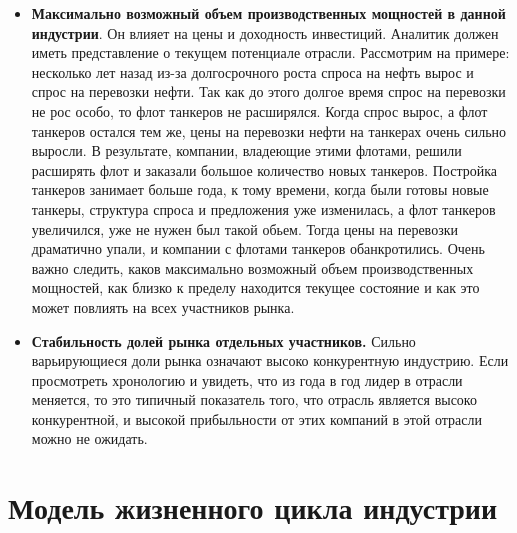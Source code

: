 \documentclass{article}
\begin{document}
\begin{itemize}
	\item \textbf {Максимально возможный объем производственных мощностей в данной индустрии}. Он влияет на цены и доходность инвестиций. Аналитик должен иметь представление о текущем потенциале отрасли. Рассмотрим на примере: несколько лет назад из-за долгосрочного роста спроса на нефть вырос и спрос на перевозки нефти. Так как до этого долгое время спрос на перевозки не рос особо, то флот танкеров не расширялся. Когда спрос вырос, а флот танкеров остался тем же, цены на перевозки нефти на танкерах очень сильно выросли. В результате, компании, владеющие этими флотами, решили расширять флот и заказали большое количество новых танкеров. Постройка танкеров занимает больше года, к тому времени, когда были готовы новые танкеры, структура спроса и предложения уже изменилась, а флот танкеров увеличился, уже не нужен был такой обьем. Тогда цены на перевозки драматично упали, и компании с флотами танкеров обанкротились. Очень важно следить, каков максимально возможный объем производственных мощностей, как близко к пределу находится текущее состояние и как это может повлиять на всех участников рынка. 
	
	\item \textbf{Стабильность долей рынка отдельных участников.} Сильно варьирующиеся доли рынка означают высоко конкурентную индустрию. Если просмотреть хронологию и увидеть, что из года в год лидер в отрасли меняется, то это типичный показатель того, что отрасль является высоко конкурентной, и высокой прибыльности от этих компаний в этой отрасли можно не ожидать.
	
	\end{itemize}
	\newpage
	
	\section{Модель жизненного цикла индустрии}
	
\end{document}
